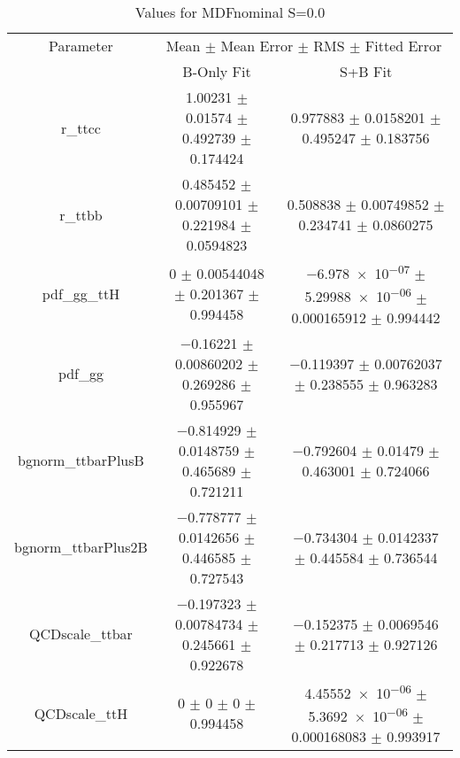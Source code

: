 \begin{table}
\centering
\caption{Values for MDFnominal S=0.0}
\begin{tabular}{ccc}
\toprule
Parameter & \multicolumn{2}{c}{Mean $\pm$ Mean Error $\pm$ RMS $\pm$ Fitted Error}\\
 & B-Only Fit & S+B Fit\\
\midrule
r\_ttcc & \num{1.00231} $\pm$ \num{0.01574} $\pm$ \num{0.492739} $\pm$ \num{0.174424} & \num{0.977883} $\pm$ \num{0.0158201} $\pm$ \num{0.495247} $\pm$ \num{0.183756}\\
r\_ttbb & \num{0.485452} $\pm$ \num{0.00709101} $\pm$ \num{0.221984} $\pm$ \num{0.0594823} & \num{0.508838} $\pm$ \num{0.00749852} $\pm$ \num{0.234741} $\pm$ \num{0.0860275}\\
pdf\_gg\_ttH & \num{0} $\pm$ \num{0.00544048} $\pm$ \num{0.201367} $\pm$ \num{0.994458} & \num{-6.978e-07} $\pm$ \num{5.29988e-06} $\pm$ \num{0.000165912} $\pm$ \num{0.994442}\\
pdf\_gg & \num{-0.16221} $\pm$ \num{0.00860202} $\pm$ \num{0.269286} $\pm$ \num{0.955967} & \num{-0.119397} $\pm$ \num{0.00762037} $\pm$ \num{0.238555} $\pm$ \num{0.963283}\\
bgnorm\_ttbarPlusB & \num{-0.814929} $\pm$ \num{0.0148759} $\pm$ \num{0.465689} $\pm$ \num{0.721211} & \num{-0.792604} $\pm$ \num{0.01479} $\pm$ \num{0.463001} $\pm$ \num{0.724066}\\
bgnorm\_ttbarPlus2B & \num{-0.778777} $\pm$ \num{0.0142656} $\pm$ \num{0.446585} $\pm$ \num{0.727543} & \num{-0.734304} $\pm$ \num{0.0142337} $\pm$ \num{0.445584} $\pm$ \num{0.736544}\\
QCDscale\_ttbar & \num{-0.197323} $\pm$ \num{0.00784734} $\pm$ \num{0.245661} $\pm$ \num{0.922678} & \num{-0.152375} $\pm$ \num{0.0069546} $\pm$ \num{0.217713} $\pm$ \num{0.927126}\\
QCDscale\_ttH & \num{0} $\pm$ \num{0} $\pm$ \num{0} $\pm$ \num{0.994458} & \num{4.45552e-06} $\pm$ \num{5.3692e-06} $\pm$ \num{0.000168083} $\pm$ \num{0.993917}\\
\bottomrule
\end{tabular}
\end{table}
